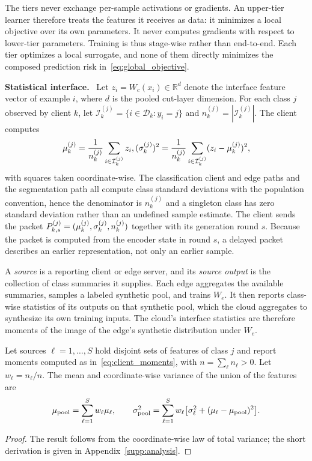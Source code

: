 The tiers never exchange per-sample activations or gradients. An upper-tier learner therefore treats the features it receives as data: it minimizes a local objective over its own parameters. It never computes gradients with respect to lower-tier parameters. Training is thus stage-wise rather than end-to-end. Each tier optimizes a local surrogate, and none of them directly minimizes the composed prediction risk in~\eqref{eq:global_objective}.

\noindent\textbf{Statistical interface.}~
Let $z_i=W_c(x_i)\in\mathbb R^d$ denote the interface feature vector of example $i$, where $d$ is the pooled cut-layer dimension. For each class $j$ observed by client $k$, let $\mathcal I_k^{(j)}=\{i\in\mathcal D_k:y_i=j\}$ and $n_k^{(j)}=|\mathcal I_k^{(j)}|$. The client computes
\begin{equation}
 \mu_k^{(j)}=\frac{1}{n_k^{(j)}}\sum_{i\in\mathcal I_k^{(j)}}z_i,
 (\sigma_k^{(j)})^2=\frac{1}{n_k^{(j)}}\sum_{i\in\mathcal I_k^{(j)}}(z_i-\mu_k^{(j)})^2,
 \label{eq:client_moments}
\end{equation}
with squares taken coordinate-wise. The classification client and edge paths and the segmentation path all compute class standard deviations with the population convention, hence the denominator is $n_k^{(j)}$ and a singleton class has zero standard deviation rather than an undefined sample estimate. The client sends the packet $P_{k,s}^{(j)}=(\mu_k^{(j)},\sigma_k^{(j)},n_k^{(j)})$ together with its generation round $s$. Because the packet is computed from the encoder state in round $s$, a delayed packet describes an earlier representation, not only an earlier sample.

A \emph{source} is a reporting client or edge server, and its \emph{source output} is the collection of class summaries it supplies. Each edge aggregates the available summaries, samples a labeled synthetic pool, and trains $W_e$. It then reports class-wise statistics of its outputs on that synthetic pool, which the cloud aggregates to synthesize its own training inputs. The cloud's interface statistics are therefore moments of the image of the edge's synthetic distribution under $W_e$.

\begin{lemma}
\label{lem:exact_pooling}
Let sources $\ell=1,\ldots,S$ hold disjoint sets of features of class $j$ and report moments computed as in~\eqref{eq:client_moments}, with $n=\sum_\ell n_\ell>0$. Let $w_\ell=n_\ell/n$. The mean and coordinate-wise variance of the union of the features are
\begin{equation}
 \mu_{\mathrm{pool}}=\sum_{\ell=1}^{S}w_\ell\mu_\ell,
 \qquad
 \sigma_{\mathrm{pool}}^2=\sum_{\ell=1}^{S}w_\ell\bigl[\sigma_\ell^2+(\mu_\ell-\mu_{\mathrm{pool}})^2\bigr].
 \label{eq:exact_pooling}
\end{equation}
\end{lemma}
\begin{proof}
The result follows from the coordinate-wise law of total variance; the short derivation is given in Appendix~\ref{supp:analysis}.
\end{proof}

